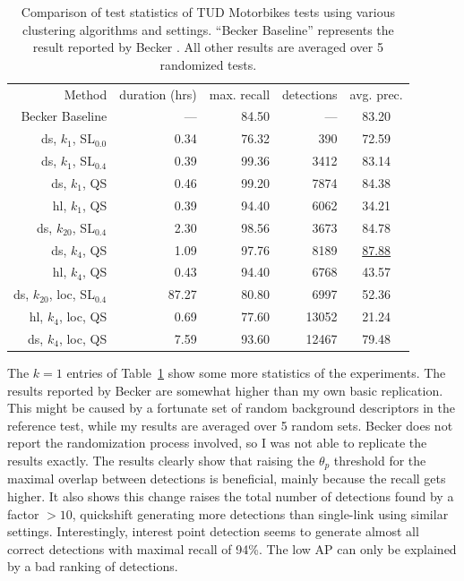 \begin{table}
    \caption{Comparison of test statistics of TUD Motorbikes tests using various clustering algorithms and settings. ``Becker Baseline'' represents the result reported by Becker \cite{becker2012codebook}. All other results are averaged over 5 randomized tests.}
    \label{tab:tudallstats}
    \begin{tabular}{r|rrr|c}
    Method&duration (hrs)&max. recall&detections&avg. prec.\\
    Becker Baseline&---&84.50&---&83.20\\
    ds, $k_1$, SL$_{0.0}$&0.34&76.32&390&72.59\\
    ds, $k_1$, SL$_{0.4}$&0.39&99.36&3412&83.14\\
    ds, $k_1$, QS &0.46&99.20&7874&84.38\\
    hl, $k_1$, QS &0.39&94.40&6062&34.21\\
    ds, $k_{20}$, SL$_{0.4}$&2.30&98.56&3673&84.78\\
    ds, $k_4$, QS &1.09&97.76&8189&\underline{87.88}\\
    hl, $k_4$, QS &0.43&94.40&6768&43.57\\
    ds, $k_{20}$, loc, SL$_{0.4}$&87.27&80.80&6997&52.36\\
    hl, $k_4$, loc, QS &0.69&77.60&13052&21.24\\
    ds, $k_4$, loc, QS &7.59&93.60&12467&79.48
    \end{tabular}
\end{table}

The $k=1$ entries of Table~\ref{tab:tudallstats} show some more statistics of the experiments. The results reported by Becker are somewhat higher than my own basic replication. This might be caused by a fortunate set of random background descriptors in the reference test, while my results are averaged over 5 random sets. Becker does not report the randomization process involved, so I was not able to replicate the results exactly. The results clearly show that raising the $\theta_p$ threshold for the maximal overlap between detections is beneficial, mainly because the recall gets higher. It also shows this change raises the total number of detections found by a factor $>10$, quickshift generating more detections than single-link using similar settings. Interestingly, interest point detection seems to generate almost all correct detections with maximal recall of 94\%. The low AP can only be explained by a bad ranking of detections.

